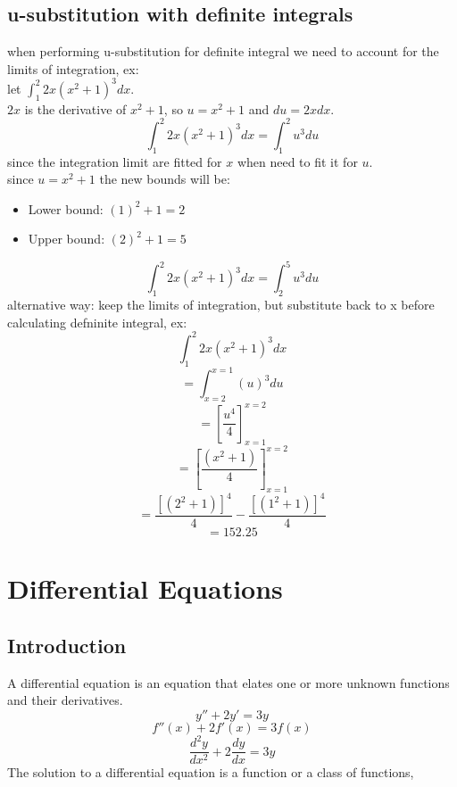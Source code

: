 \documentclass{article}
\begin{document}
                        \subsection{u-substitution with definite integrals}
                                when performing u-substitution for definite integral we need to account for the limits of integration, ex: \\ 
                                let \(\int_{1}^{2} 2x{(x^{2} + 1)}^{3}dx\).\\
                                \(2x\) is the derivative of \(x^{2} + 1\), so \(u = x^2 + 1\) and \(du = 2x dx\). \\
                                    \[\int_{1}^{2} 2x{(x^{2} + 1)}^{3}dx = \int_{1}^{2} u^{3} du\]
                                since the integration limit are fitted for \(x\) when need to fit it for \(u\). \\ 
                                since \(u = x^2 + 1\) the new bounds will be: 
                                \begin{itemize}
                                    \item Lower bound: \({(1)}^2 + 1 = 2\)
                                    \item Upper bound: \({(2)}^2 + 1 = 5\)
                                \end{itemize}
                                     \[\int_{1}^{2} 2x{(x^{2} + 1)}^{3}dx = \int_{2}^{5} u^{3} du\]
                                alternative way: keep the limits of integration, but substitute back to x before calculating defninite integral, ex: 
                                    \[\int_{1}^{2} 2x{(x^{2} + 1)}^{3}dx\]
                                    \[ = \int_{x = 2 }^{x = 1} {(u)}^3du\]
                                    \[ = {[\frac{u^4}{4}]}^{x = 2}_{x = 1}\]
                                    \[ = {[\frac{(x^2 + 1 )}{4}]}^{x = 2}_{x = 1}\]
                                    \[ = \frac{{[(2^2 + 1 )]}^4}{4} - \frac{{[(1^2 + 1 )]}^4}{4}\]
                                    \[ = 152.25\]
               \section{Differential Equations} 
                         \subsection{Introduction}
                              A differential equation is an equation that elates one or more unknown functions and their derivatives. 
                               \[y'' + 2y' = 3y \]
                               \[f''(x) + 2f'(x) = 3f(x) \]
                               \[\frac{d^2 y}{d x^2} + 2 \frac{dy}{dx} = 3y \]
                               The solution to a differential equation is a function or a class of functions, 
\end{document}
